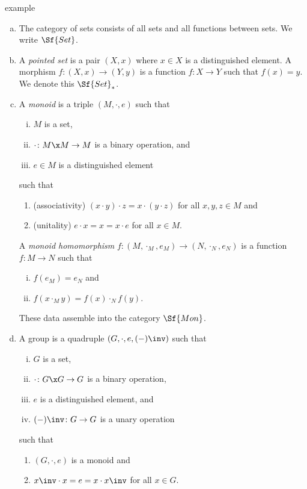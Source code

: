 \documentclass[class=article, crop=false]{standalone}
\begin{document}
\begin{understandingcheck}{example}
  \begin{enumerate}[(a)]
    \item
      The category of sets consists of all sets and all functions between sets. We write $\Sf{Set}$.

    \item
      A \emph{pointed set} is a pair $(X,x)$ where $x \in X$ is a distinguished element. A morphism $f\colon (X,x) \to (Y,y)$ is a function $f\colon X \to Y$ such that $f(x) = y$. We denote this $\Sf{Set}_*$.

    \item
      A \emph{monoid} is a triple $(M, \cdot, e)$ such that
        \begin{enumerate}[(i)]
          \item $M$ is a set,
          \item $\cdot \colon M \x M \to M$ is a binary operation, and
          \item $e \in M$ is a distinguished element
        \end{enumerate}
      such that
        \begin{enumerate}[(M1)]
          \item (associativity) $(x \cdot y) \cdot z = x \cdot (y \cdot z)$ for all $x,y,z \in M$ and
          \item (unitality) $e \cdot x = x = x \cdot e$ for all $x \in M$.
        \end{enumerate}
      A \emph{monoid homomorphism} $f\colon (M, \cdot_M, e_M) \to (N, \cdot_N, e_N)$ is a function $f\colon M \to N$ such that
        \begin{enumerate}[(i)]
          \item $f(e_M) = e_N$ and
          \item $f(x \cdot_M y) = f(x) \cdot_N f(y)$.
        \end{enumerate}
      These data assemble into the category $\Sf{Mon}$.

    \item
      A group is a quadruple $(G, \cdot, e, (-)\inv)$ such that
        \begin{enumerate}[(i)]
          \item $G$ is a set,
          \item $\cdot \colon G \x G \to G$ is a binary operation,
          \item $e$ is a distinguished element, and
          \item $(-)\inv \colon G \to G$ is a unary operation
        \end{enumerate}
      such that
        \begin{enumerate}[(G1)]
          \item $(G, \cdot, e)$ is a monoid and
          \item $x\inv \cdot x = e = x \cdot x \inv$ for all $x \in G$.
        \end{enumerate}


\end{enumerate}
\end{understandingcheck}
\end{document}
